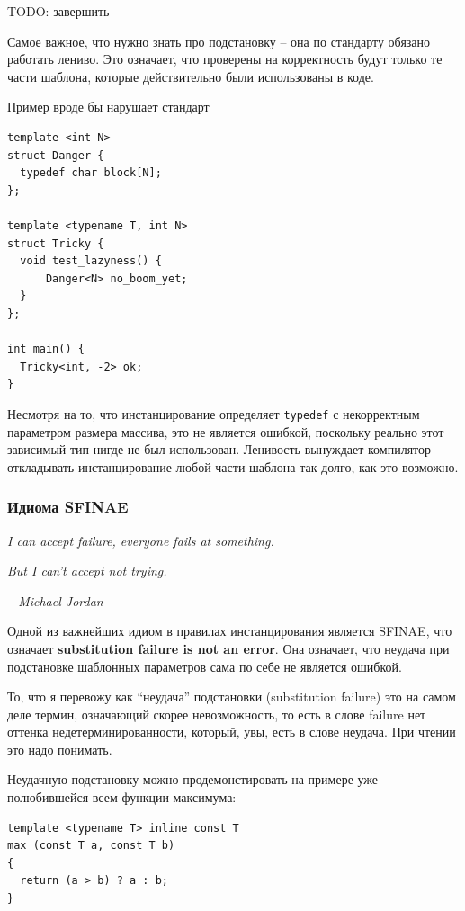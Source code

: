 \documentclass[a4paper,12pt,oneside]{article}
\begin{document}
TODO: завершить

Самое важное, что нужно знать про подстановку -- она по стандарту обязано работать лениво. Это означает, что проверены на корректность будут только те части шаблона, которые действительно были использованы в коде.

Пример вроде бы нарушает стандарт

\begin{lstlisting}
template <int N>
struct Danger {
  typedef char block[N]; 
};

template <typename T, int N>
struct Tricky {
  void test_lazyness() {
      Danger<N> no_boom_yet;
  }
};

int main() {
  Tricky<int, -2> ok;
}
\end{lstlisting}

Несмотря на то, что инстанцирование определяет \lstinline!typedef! с некорректным параметром размера массива, это не является ошибкой, поскольку реально этот зависимый тип нигде не был использован. Ленивость вынуждает компилятор откладывать инстанцирование любой части шаблона так долго, как это возможно.

\subsubsection{Идиома SFINAE}\label{SFINAE}

\hfill\textit{I can accept failure, everyone fails at something.}

\hfill\textit{But I can't accept not trying.}{\vspace{0.5em}}

\hfill\textit{-- Michael Jordan}

Одной из важнейших идиом в правилах инстанцирования является SFINAE, что означает \textbf{substitution failure is not an error}. Она означает, что неудача при подстановке шаблонных параметров сама по себе не является ошибкой.

То, что я перевожу как ``неудача'' подстановки (substitution failure) это на самом деле термин, означающий скорее невозможность, то есть в слове failure нет оттенка недетерминированности, который, увы, есть в слове неудача. При чтении это надо понимать. 

Неудачную подстановку можно продемонстировать на примере уже полюбившейся всем функции максимума:

\begin{lstlisting}
template <typename T> inline const T
max (const T a, const T b)
{
  return (a > b) ? a : b;
}
\end{lstlisting}
\end{document}
